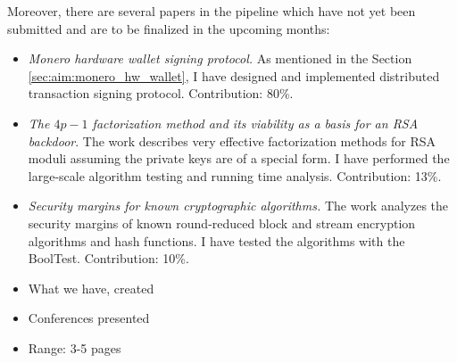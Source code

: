 \documentclass[
  digital, %
  twoside, %
  table,   %
  lof,     %
  lot,     %
]{fithesis3}
\theoremstyle{definition}
\theoremstyle{remark}
\begin{document}
Moreover, there are several papers in the pipeline which have not yet been submitted and are to be finalized in the upcoming months:

\begin{itemize}
	\item \emph{Monero hardware wallet signing protocol.} As mentioned in the Section \ref{sec:aim:monero_hw_wallet}, I have designed and implemented distributed transaction signing protocol. Contribution: 80\%.
	
	\item \emph{The $4p-1$ factorization method and its viability as a basis for an RSA backdoor}. The work describes very effective factorization methods for RSA moduli assuming the private keys are of a special form. I have performed the large-scale algorithm testing and running time analysis. Contribution: 13\%.
	
	\item \emph{Security margins for known cryptographic algorithms.} The work analyzes the security margins of known round-reduced block and stream encryption algorithms and hash functions. I have tested the algorithms with the BoolTest. Contribution: 10\%.	
\end{itemize}

%	
%	
%	


\newpage
\begin{shaded}
\begin{itemize}
    \item What we have, created
    \item Conferences presented
    \item Range: 3-5 pages
\end{itemize}
\end{shaded}
\end{document}
